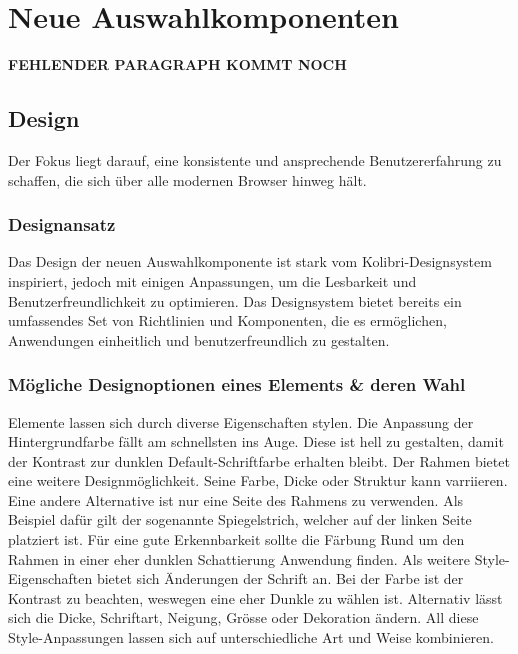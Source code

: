 \chapter{Neue Auswahlkomponenten}
\label{chap:newComponent}

{\color{red} \textbf{FEHLENDER PARAGRAPH KOMMT NOCH}}


\section{Design}
\label{sec:design}

Der Fokus liegt darauf, eine konsistente und ansprechende Benutzererfahrung zu schaffen, die sich über alle modernen Browser hinweg hält.


\subsection{Designansatz}
\label{sec:designIdea}

Das Design der neuen Auswahlkomponente ist stark vom Kolibri-Designsystem inspiriert, jedoch mit einigen Anpassungen, um die Lesbarkeit und Benutzerfreundlichkeit zu optimieren. 
Das Designsystem bietet bereits ein umfassendes Set von Richtlinien und Komponenten, die es ermöglichen, Anwendungen einheitlich und benutzerfreundlich zu gestalten.


\subsection{Mögliche Designoptionen eines Elements \& deren Wahl}
\label{sec:possibleDesignOptions}

Elemente lassen sich durch diverse Eigenschaften stylen.
Die Anpassung der Hintergrundfarbe fällt am schnellsten ins Auge.
Diese ist hell zu gestalten, damit der Kontrast zur dunklen Default-Schriftfarbe erhalten bleibt.
Der Rahmen bietet eine weitere Designmöglichkeit. 
Seine Farbe, Dicke oder Struktur kann varriieren. 
Eine andere Alternative ist nur eine Seite des Rahmens zu verwenden. 
Als Beispiel dafür gilt der sogenannte Spiegelstrich, welcher auf der linken Seite platziert ist.
Für eine gute Erkennbarkeit sollte die Färbung Rund um den Rahmen in einer eher dunklen Schattierung Anwendung finden.
Als weitere Style-Eigenschaften bietet sich Änderungen der Schrift an.
Bei der Farbe ist der Kontrast zu beachten, weswegen eine eher Dunkle zu wählen ist.
Alternativ lässt sich die Dicke, Schriftart, Neigung, Grösse oder Dekoration ändern.
All diese Style-Anpassungen lassen sich auf unterschiedliche Art und Weise kombinieren.

